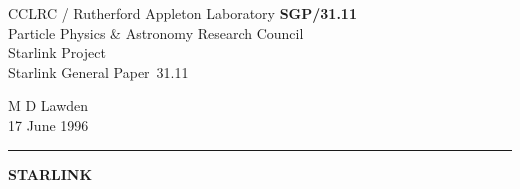 \documentclass[twoside,11pt]{article}
\newcommand{\stardoccategory}  {Starlink General Paper}
\newcommand{\stardocinitials}  {SGP}
\newcommand{\stardocnumber}    {31.11}
\newcommand{\stardocauthors}   {M D Lawden}
\newcommand{\stardocdate}      {17 June 1996}
\newcommand{\stardoctitle}     {{\Large\bf STARLINK}}
\newcommand{\stardocname}{\stardocinitials /\stardocnumber}
\newenvironment{latexonly}{}{}
\begin{document}
\thispagestyle{empty}

\begin{latexonly}
   {\small CCLRC / {\sc Rutherford Appleton Laboratory} \hfill {\bf \stardocname}}\\
   Particle Physics \& Astronomy Research Council\\
   Starlink Project\\
   \stardoccategory\ \stardocnumber
   \begin{flushright}
   \stardocauthors\\
   \stardocdate
   \end{flushright}
   \vspace{-4mm}
   \rule{\textwidth}{0.5mm}
   \vspace{3mm}
   \begin{center}
   {\large\bf \stardoctitle}
   \end{center}
\end{latexonly}
\end{document}
